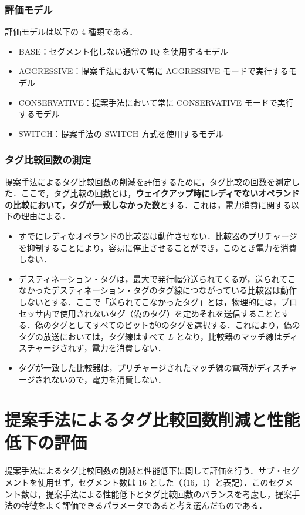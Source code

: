 \subsubsection{評価モデル}
評価モデルは以下の 4 種類である．
\begin{itemize}
  \item BASE：セグメント化しない通常の IQ を使用するモデル
  \item AGGRESSIVE：提案手法において常に AGGRESSIVE モードで実行するモデル
  \item CONSERVATIVE：提案手法において常に CONSERVATIVE モードで実行するモデル
  \item SWITCH：提案手法の SWITCH 方式を使用するモデル 
\end{itemize}

\subsubsection{タグ比較回数の測定}
提案手法によるタグ比較回数の削減を評価するために，タグ比較の回数を測定した．ここで，タグ比較の回数とは，\textbf{ウェイクアップ時にレディでないオペランドの比較において，タグが一致しなかった数}とする．これは，電力消費に関する以下の理由による．

\begin{itemize}
  \item すでにレディなオペランドの比較器は動作させない．比較器のプリチャージを抑制することにより，容易に停止させることができ，このとき電力を消費しない．
  \item デスティネーション・タグは，最大で発行幅分送られてくるが，送られてこなかったデスティネーション・タグのタグ線につながっている比較器は動作しないとする．ここで「送られてこなかったタグ」とは，物理的には，プロセッサ内で使用されないタグ（偽のタグ）を定めそれを送信することとする．偽のタグとしてすべてのビットが0のタグを選択する．これにより，偽のタグの放送においては，タグ線はすべて $L$ となり，比較器のマッチ線はディスチャージされず，電力を消費しない．
  \item タグが一致した比較器は，プリチャージされたマッチ線の電荷がディスチャージされないので，電力を消費しない．
\end{itemize}

\section{提案手法によるタグ比較回数削減と性能低下の評価}
\label{sec:eval_segIQ}
提案手法によるタグ比較回数の削減と性能低下に関して評価を行う．サブ・セグメントを使用せず，セグメント数は 16 とした（（16，1）と表記）．このセグメント数は，提案手法による性能低下とタグ比較回数のバランスを考慮し，提案手法の特徴をよく評価できるパラメータであると考え選んだものである．

